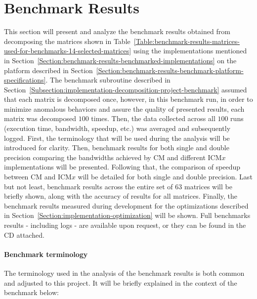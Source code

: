 \section{Benchmark Results \TO}\label{Section:comparing-decomposition-implementations-benchmark-results}
This section will present and analyze the benchmark results obtained from decomposing the matrices shown in Table~\ref{Table:benchmark-results-matrices-used-for-benchmarks-14-selected-matrices} using the implementations mentioned in Section~\ref{Section:benchmark-results-benchmarked-implementations} on the platform described in Section~\ref{Section:benchmark-results-benchmark-platform-specifications}. The benchmark subroutine described in Section~\ref{Subsection:implementation-decomposition-project-benchmark} assumed that each matrix is decomposed once, however, in this benchmark run, in order to minimize anomalous behaviors and assure the quality of presented results, each matrix was decomposed $ 100 $ times. Then, the data collected across all $ 100 $ runs (execution time, bandwidth, speedup, etc.) was averaged and subsequently logged. First, the terminology that will be used during the analysis will be introduced for clarity. Then, benchmark results for both single and double precision comparing the bandwidths achieved by CM and different ICM$ x $ implementations will be presented. Following that, the comparison of speedup between CM and ICM$ x $ will be detailed for both single and double precision. Last but not least, benchmark results across the entire set of $ 63 $ matrices will be briefly shown, along with the accuracy of results for all matrices. Finally, the benchmark results measured during development for the optimizations described in Section~\ref{Section:implementation-optimization} will be shown. Full benchmarks results - including logs - are available upon request, or they can be found in the CD attached.

\paragraph{Benchmark terminology} The terminology used in the analysis of the benchmark results is both common and adjusted to this project. It will be briefly explained in the context of the benchmark below:

